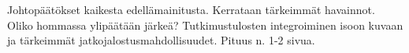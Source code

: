 Johtopäätökset kaikesta edellämainitusta. Kerrataan tärkeimmät havainnot. Oliko hommassa ylipäätään järkeä? Tutkimustulosten integroiminen isoon kuvaan ja tärkeimmät jatkojalostusmahdollisuudet. Pituus n. 1-2 sivua.
